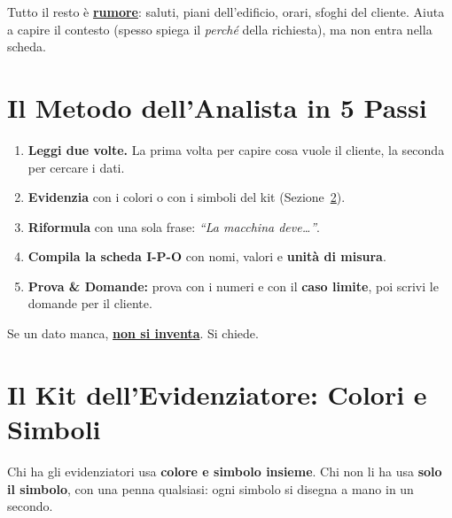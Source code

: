 \begin{concetto}[Il Rumore]
Tutto il resto è \textbf{\underline{rumore}}: saluti, piani dell'edificio, orari, sfoghi del cliente. Aiuta a capire il contesto (spesso spiega il \emph{perché} della richiesta), ma non entra nella scheda.
\end{concetto}

\section{Il Metodo dell'Analista in 5 Passi}

\begin{enumerate}
  \item \textbf{Leggi due volte.} La prima volta per capire cosa vuole il cliente, la seconda per cercare i dati.
  \item \textbf{Evidenzia} con i colori o con i simboli del kit (Sezione~\ref{sec:kit-seconda}).
  \item \textbf{Riformula} con una sola frase: \emph{``La macchina deve\dots''}.
  \item \textbf{Compila la scheda I-P-O} con nomi, valori e \textbf{unità di misura}.
  \item \textbf{Prova \& Domande:} prova con i numeri e con il \textbf{caso limite}, poi scrivi le domande per il cliente.
\end{enumerate}

\begin{concetto}
Se un dato manca, \textbf{\underline{non si inventa}}. Si chiede.
\end{concetto}

\section{Il Kit dell'Evidenziatore: Colori e Simboli}
\label{sec:kit-seconda}

Chi ha gli evidenziatori usa \textbf{colore e simbolo insieme}. Chi non li ha usa \textbf{solo il simbolo}, con una penna qualsiasi: ogni simbolo si disegna a mano in un secondo.

